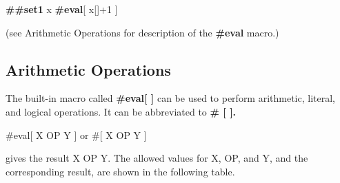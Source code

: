\textbf{\#\#set1} x \textbf{\#eval}{[} x{[}{]}+1 {]}

(see Arithmetic Operations for description of the \textbf{\#eval} macro.)

\subsection{Arithmetic Operations}\label{arithmetic-operations}

The built-in macro called \textbf{\#eval{[} {]}} can be used to perform arithmetic, literal, and logical operations. It can be abbreviated to \textbf{\# {[} {]}.}

\#eval{[} X OP Y {]} or \#{[} X OP Y {]}

gives the result X OP Y. The allowed values for X, OP, and Y, and the corresponding result, are shown in the following table.

